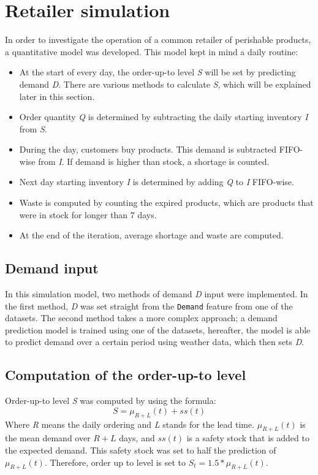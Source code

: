 \documentclass[final,authoryear,5p,times,twocolumn, 11pt]{elsarticle}
\begin{document}
\section{Retailer simulation}
\label{sec:retailer}
In order to investigate the operation of a common retailer of perishable products, a quantitative model was developed. This model kept in mind a daily routine:
\begin{itemize}[]
	\item At the start of every day, the order-up-to level \textit{S} will be set by predicting demand \textit{D}. There are various methods to calculate \textit{S}, which will be explained later in this section.
	\item Order quantity \textit{Q} is determined by subtracting the daily starting inventory \textit{I} from \textit{S}.
	\item During the day, customers buy products. This demand is subtracted FIFO-wise from \textit{I}. If demand is higher than stock, a shortage is counted.
	\item Next day starting inventory \textit{I} is determined by adding \textit{Q} to \textit{I} FIFO-wise.
	\item Waste is computed by counting the expired products, which are products that were in stock for longer than 7 days.
	\item At the end of the iteration, average shortage and waste are computed.
\end{itemize}

\subsection{Demand input}
In this simulation model, two methods of demand \textit{D} input were implemented. In the first method, \textit{D} was set straight from the \texttt{Demand} feature from one of the datasets. The second method takes a more complex approach; a demand prediction model is trained using one of the datasets, hereafter, the model is able to predict demand over a certain period using weather data, which then sets \textit{D}.

\subsection{Computation of the order-up-to level}
Order-up-to level \textit{S} was computed by using the formula: 
\begin{equation}
S = \mu_{R+L}(t) + ss(t)
\end{equation}
Where \textit{R} means the daily ordering and \textit{L} stands for the lead time. $\mu_{R+L}(t)$ is the mean demand over $R+L$ days, and $ss(t)$ is a safety stock that is added to the expected demand. This safety stock was set to half the prediction of $\mu_{R+L}(t)$. Therefore, order up to level is set to $S_{t} = 1.5*\mu_{R+L}(t)$.
\end{document}
